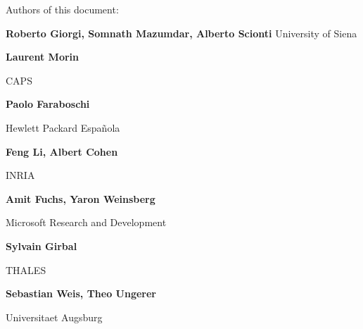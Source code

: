 \documentclass[a4paper]{article}
\begin{document}
\clearpage
{}
{

{\centering{}
Authors of this document:
\par}


\bigskip

{\centering{}
\textbf{Roberto Giorgi, Somnath Mazumdar, Alberto Scionti}
University of Siena
\par}

\bigskip

{\centering{}\bfseries
Laurent Morin
\par}

{\centering{}
CAPS
\par}


\bigskip

{\centering{}\bfseries
Paolo Faraboschi
\par}

{\centering{}
Hewlett Packard Espa\~{n}ola 
\par}


\bigskip

{\centering{}\bfseries
Feng Li, Albert Cohen
\par}

{\centering{}
INRIA
\par}


\bigskip

{\centering{}
\textbf{Amit Fuchs, Yaron Weinsberg}
\par}

{\centering{}
Microsoft Research and Development
\par}


\bigskip

{\centering{}\bfseries
Sylvain Girbal
\par}

{\centering{}
THALES
\par}


\bigskip

{\centering{}\bfseries
Sebastian Weis, Theo Ungerer 
\par}

{\centering{}
Universitaet Augsburg 
\par}


}
\end{document}
